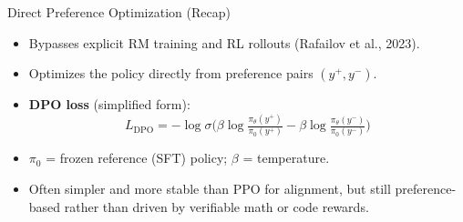\begin{frame}{Direct Preference Optimization (Recap)}
  \begin{itemize}\itemsep0.35em
    \item[\textcolor{red}{$\blacktriangleright$}] Bypasses explicit RM training and RL rollouts (Rafailov et al., 2023).
    \item[\textcolor{red}{$\blacktriangleright$}] Optimizes the policy directly from preference pairs $(y^+, y^-)$.
    \item[\textcolor{red}{$\blacktriangleright$}] \textbf{DPO loss} (simplified form):
      \[
        L_{\mathrm{DPO}} = -\log \sigma\Big(\beta \log \tfrac{\pi_\theta(y^+)}{\pi_0(y^+)} - \beta \log \tfrac{\pi_\theta(y^-)}{\pi_0(y^-)}\Big)
      \]
    \item[\textcolor{red}{$\blacktriangleright$}] $\pi_0$ = frozen reference (SFT) policy; $\beta$ = temperature.
    \item[\textcolor{red}{$\blacktriangleright$}] Often simpler and more stable than PPO for alignment, but still preference-based rather than driven by verifiable math or code rewards.
  \end{itemize}
\end{frame}
